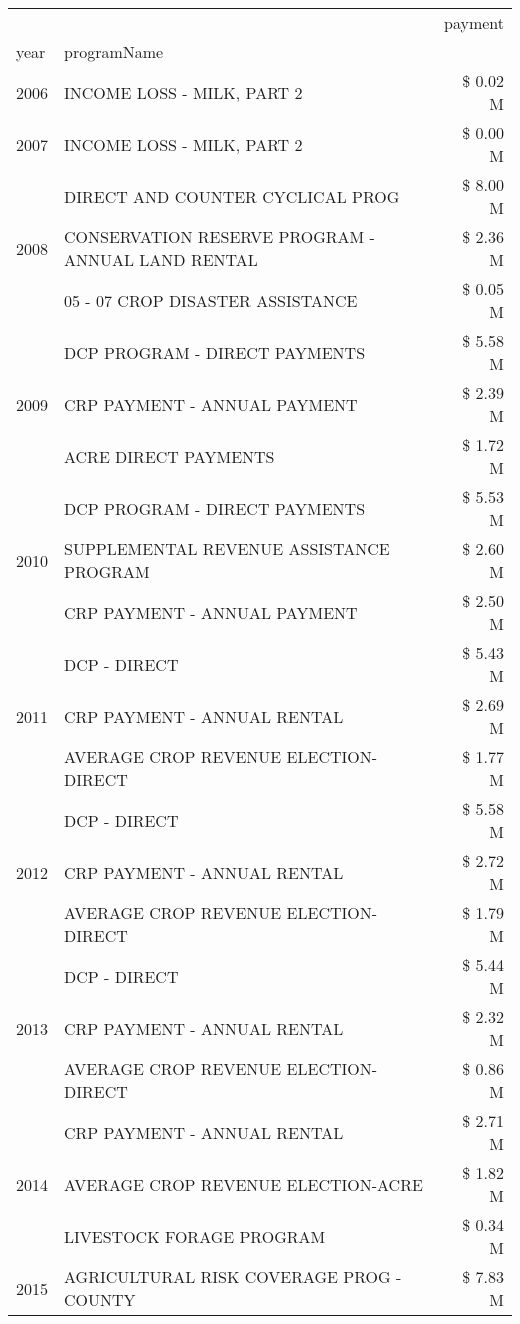 \begin{tabular}{llr}
\toprule
 &  & payment \\
year & programName &  \\
\midrule
2006 & INCOME LOSS - MILK, PART 2 & \$ 0.02 M \\
\cline{1-3}
2007 & INCOME LOSS - MILK, PART 2 & \$ 0.00 M \\
\cline{1-3}
\multirow[t]{3}{*}{2008} & DIRECT AND COUNTER CYCLICAL PROG & \$ 8.00 M \\
 & CONSERVATION RESERVE PROGRAM - ANNUAL LAND RENTAL & \$ 2.36 M \\
 & 05 - 07 CROP DISASTER ASSISTANCE & \$ 0.05 M \\
\cline{1-3}
\multirow[t]{3}{*}{2009} & DCP PROGRAM - DIRECT PAYMENTS & \$ 5.58 M \\
 & CRP PAYMENT - ANNUAL PAYMENT & \$ 2.39 M \\
 & ACRE DIRECT PAYMENTS & \$ 1.72 M \\
\cline{1-3}
\multirow[t]{3}{*}{2010} & DCP PROGRAM - DIRECT PAYMENTS & \$ 5.53 M \\
 & SUPPLEMENTAL REVENUE ASSISTANCE PROGRAM & \$ 2.60 M \\
 & CRP PAYMENT - ANNUAL PAYMENT & \$ 2.50 M \\
\cline{1-3}
\multirow[t]{3}{*}{2011} & DCP - DIRECT & \$ 5.43 M \\
 & CRP PAYMENT - ANNUAL RENTAL & \$ 2.69 M \\
 & AVERAGE CROP REVENUE ELECTION-DIRECT & \$ 1.77 M \\
\cline{1-3}
\multirow[t]{3}{*}{2012} & DCP - DIRECT & \$ 5.58 M \\
 & CRP PAYMENT - ANNUAL RENTAL & \$ 2.72 M \\
 & AVERAGE CROP REVENUE ELECTION-DIRECT & \$ 1.79 M \\
\cline{1-3}
\multirow[t]{3}{*}{2013} & DCP - DIRECT & \$ 5.44 M \\
 & CRP PAYMENT - ANNUAL RENTAL & \$ 2.32 M \\
 & AVERAGE CROP REVENUE ELECTION-DIRECT & \$ 0.86 M \\
\cline{1-3}
\multirow[t]{3}{*}{2014} & CRP PAYMENT - ANNUAL RENTAL & \$ 2.71 M \\
 & AVERAGE CROP REVENUE ELECTION-ACRE & \$ 1.82 M \\
 & LIVESTOCK FORAGE PROGRAM & \$ 0.34 M \\
\cline{1-3}
\multirow[t]{3}{*}{2015} & AGRICULTURAL RISK COVERAGE PROG - COUNTY & \$ 7.83 M \\

\end{tabular}
